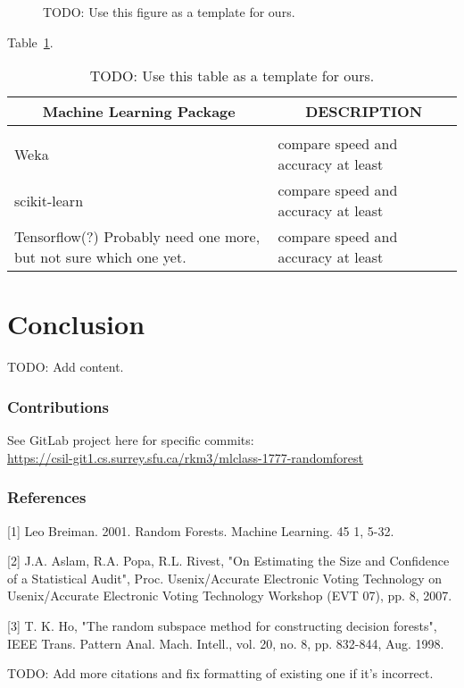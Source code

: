 \documentclass{article} %
\begin{document}
\begin{figure}[h]
\begin{center}
\fbox{\rule[-.5cm]{0cm}{4cm} \rule[-.5cm]{4cm}{0cm}}
\end{center}
\caption{TODO: Use this figure as a template for ours.}
\end{figure}

Table~\ref{sample-table}.

\begin{table}[t]
\caption{TODO: Use this table as a template for ours.}
\label{sample-table}
\begin{center}
\begin{tabular}{ll}
\multicolumn{1}{c}{\bf Machine Learning Package} &\multicolumn{1}{c}{\bf DESCRIPTION}
\\ \hline \\
Weka         &compare speed and accuracy at least \\
scikit-learn             &compare speed and accuracy at least \\
Tensorflow(?) Probably need one more, but not sure which one yet.             &compare speed and accuracy at least \\
\end{tabular}
\end{center}
\end{table}

\section{Conclusion}
TODO: Add content.

\subsubsection*{Contributions}
See GitLab project here for specific commits:\\
\href{
    https://csil-git1.cs.surrey.sfu.ca/rkm3/mlclass-1777-randomforest
}{
    https://csil-git1.cs.surrey.sfu.ca/rkm3/mlclass-1777-randomforest
}

\subsubsection*{References}


\small{
[1] Leo Breiman. 2001. Random Forests. Machine Learning. 45 1, 5-32.

[2]  J.A. Aslam, R.A. Popa, R.L. Rivest, "On Estimating the Size and Confidence of a Statistical Audit", Proc. Usenix/Accurate Electronic Voting Technology on Usenix/Accurate Electronic Voting Technology Workshop (EVT 07), pp. 8, 2007.

[3] T. K. Ho, "The random subspace method for constructing decision forests", IEEE Trans. Pattern Anal. Mach. Intell., vol. 20, no. 8, pp. 832-844, Aug. 1998.

TODO: Add more citations and fix formatting of existing one if it's incorrect.
}
\end{document}
